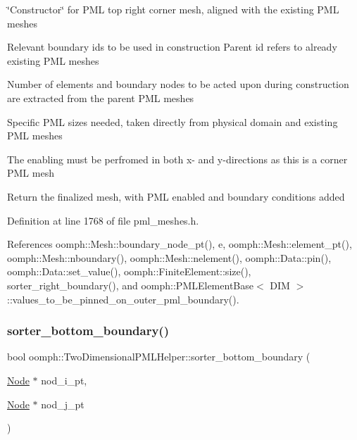 \char`\"{}\+Constructor\char`\"{} for P\+ML top right corner mesh, aligned with the existing P\+ML meshes 

Relevant boundary id\textquotesingle{}s to be used in construction Parent id refers to already existing P\+ML meshes

Number of elements and boundary nodes to be acted upon during construction are extracted from the \textquotesingle{}parent\textquotesingle{} P\+ML meshes

Specific P\+ML sizes needed, taken directly from physical domain and existing P\+ML meshes

The enabling must be perfromed in both x-\/ and y-\/directions as this is a corner P\+ML mesh

Return the finalized mesh, with P\+ML enabled and boundary conditions added 

Definition at line 1768 of file pml\+\_\+meshes.\+h.



References oomph\+::\+Mesh\+::boundary\+\_\+node\+\_\+pt(), e, oomph\+::\+Mesh\+::element\+\_\+pt(), oomph\+::\+Mesh\+::nboundary(), oomph\+::\+Mesh\+::nelement(), oomph\+::\+Data\+::pin(), oomph\+::\+Data\+::set\+\_\+value(), oomph\+::\+Finite\+Element\+::size(), sorter\+\_\+right\+\_\+boundary(), and oomph\+::\+P\+M\+L\+Element\+Base$<$ D\+I\+M $>$\+::values\+\_\+to\+\_\+be\+\_\+pinned\+\_\+on\+\_\+outer\+\_\+pml\+\_\+boundary().

\mbox{\label{namespaceoomph_1_1TwoDimensionalPMLHelper_a0bd68e9d424ff3f05266786cc6c78baa}} 
\subsubsection{\texorpdfstring{sorter\+\_\+bottom\+\_\+boundary()}{sorter\_bottom\_boundary()}}
{\footnotesize\ttfamily bool oomph\+::\+Two\+Dimensional\+P\+M\+L\+Helper\+::sorter\+\_\+bottom\+\_\+boundary (\begin{DoxyParamCaption}\item[{\hyperlink{classoomph_1_1Node}{Node} $\ast$}]{nod\+\_\+i\+\_\+pt,  }\item[{\hyperlink{classoomph_1_1Node}{Node} $\ast$}]{nod\+\_\+j\+\_\+pt }\end{DoxyParamCaption})}



